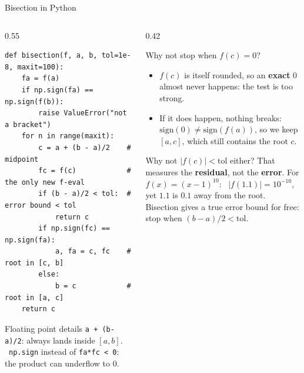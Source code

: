 \documentclass[aspectratio=169]{beamer}
\begin{document}
\begin{frame}[fragile]{Bisection in Python}
\begin{columns}[T]
\begin{column}{0.55\textwidth}
\begin{lstlisting}[basicstyle=\ttfamily\scriptsize]
def bisection(f, a, b, tol=1e-8, maxit=100):
    fa = f(a)
    if np.sign(fa) == np.sign(f(b)):
        raise ValueError("not a bracket")
    for n in range(maxit):
        c = a + (b - a)/2    # midpoint
        fc = f(c)            # the only new f-eval
        if (b - a)/2 < tol:  # error bound < tol
            return c
        if np.sign(fc) == np.sign(fa):
            a, fa = c, fc    # root in [c, b]
        else:
            b = c            # root in [a, c]
    return c
\end{lstlisting}
\vspace{-0.15cm}
\begin{block}{Floating point details}
\scriptsize
\texttt{a + (b-a)/2}: always lands inside $[a,b]$. \ \texttt{np.sign} instead of \texttt{fa*fc < 0}: the product can underflow to $0$.
\end{block}
\end{column}
\begin{column}{0.42\textwidth}
\begin{alertblock}{Why not stop when $f(c) = 0$?}
\footnotesize
\begin{itemize}
  \item $f(c)$ is itself rounded, so an \textbf{exact} $0$ almost never happens: the test is too strong.
  \item If it does happen, nothing breaks: $\mathrm{sign}(0) \ne \mathrm{sign}(f(a))$, so we keep $[a, c]$, which still contains the root $c$.
\end{itemize}
\end{alertblock}
\begin{block}{Why not $|f(c)| < \text{tol}$ either?}
\scriptsize
That measures the \textbf{residual}, not the \textbf{error}. For $f(x) = (x-1)^{10}$: \ $|f(1.1)| = 10^{-10}$, yet $1.1$ is $0.1$ away from the root.\\[3pt]
Bisection gives a true error bound for free: stop when $(b-a)/2 < \text{tol}$.
\end{block}
\end{column}
\end{columns}
\end{frame}
\end{document}
